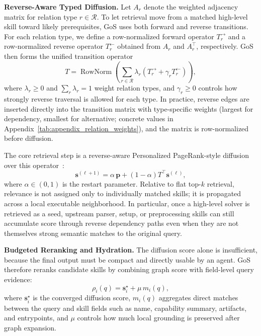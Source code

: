 \noindent\textbf{Reverse-Aware Typed Diffusion.}
Let $A_r$ denote the weighted adjacency matrix for relation type $r \in \mathcal{R}$. To let retrieval move from a matched high-level skill toward likely prerequisites, GoS uses both forward and reverse transitions. For each relation type, we define a row-normalized forward operator $T_r^{\rightarrow}$ and a row-normalized reverse operator $T_r^{\leftarrow}$ obtained from $A_r$ and $A_r^{\top}$, respectively. GoS then forms the unified transition operator
\begin{equation}
T = \operatorname{RowNorm}\!\left( \sum_{r \in \mathcal{R}} \lambda_r \left(T_r^{\rightarrow} + \gamma_r T_r^{\leftarrow}\right) \right),
\label{eq:transition}
\end{equation}
where $\lambda_r \ge 0$ and $\sum_r \lambda_r = 1$ weight relation types, and $\gamma_r \ge 0$ controls how strongly reverse traversal is allowed for each type. In practice, reverse edges are inserted directly into the transition matrix with type-specific weights (largest for dependency, smallest for alternative; concrete values in Appendix~\ref{tab:appendix_relation_weights}), and the matrix is row-normalized before diffusion.

The core retrieval step is a reverse-aware Personalized PageRank-style diffusion over this operator~\citep{page1999pagerank, jeh2003scaling, 10471277}:
\begin{equation}
\mathbf{s}^{(\ell+1)} = \alpha \, \mathbf{p} + (1-\alpha) T^{\top} \mathbf{s}^{(\ell)},
\label{eq:ppr}
\end{equation}
where $\alpha \in (0,1)$ is the restart parameter. Relative to flat top-$k$ retrieval, relevance is not assigned only to individually matched skills; it is propagated across a local executable neighborhood. In particular, once a high-level solver is retrieved as a seed, upstream parser, setup, or preprocessing skills can still accumulate score through reverse dependency paths even when they are not themselves strong semantic matches to the original query.

\noindent\textbf{Budgeted Reranking and Hydration.}
The diffusion score alone is insufficient, because the final output must be compact and directly usable by an agent. GoS therefore reranks candidate skills by combining graph score with field-level query evidence:
\begin{equation}
\rho_i(q) = \mathbf{s}_i^{\star} + \mu \, m_i(q),
\label{eq:rerank}
\end{equation}
where $\mathbf{s}_i^{\star}$ is the converged diffusion score, $m_i(q)$ aggregates direct matches between the query and skill fields such as name, capability summary, artifacts, and entrypoints, and $\mu$ controls how much local grounding is preserved after graph expansion.

